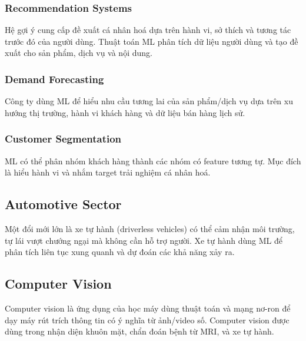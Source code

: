 \subsubsection{Recommendation Systems}
\begin{ynghia}[title={Hệ gợi ý}]
Hệ gợi ý cung cấp đề xuất cá nhân hoá dựa trên hành vi, sở thích và tương tác trước đó của người dùng.
Thuật toán ML phân tích dữ liệu người dùng và tạo đề xuất cho sản phẩm, dịch vụ và nội dung.
\end{ynghia}

\subsubsection{Demand Forecasting}
\begin{ynghia}[title={Dự báo nhu cầu}]
Công ty dùng ML để hiểu nhu cầu tương lai của sản phẩm/dịch vụ dựa trên xu hướng thị trường, hành vi khách hàng và dữ liệu bán hàng lịch sử.
\end{ynghia}

\subsubsection{Customer Segmentation}
\begin{ynghia}[title={Phân khúc khách hàng}]
ML có thể phân nhóm khách hàng thành các nhóm có feature tương tự.
Mục đích là hiểu hành vi và nhắm target trải nghiệm cá nhân hoá.
\end{ynghia}

\subsection{Automotive Sector}

\begin{dongco}[title={Xe tự hành}]
Một đổi mới lớn là xe tự hành (driverless vehicles) có thể cảm nhận môi trường, tự lái vượt chướng ngại mà không cần hỗ trợ người.
Xe tự hành dùng ML để phân tích liên tục xung quanh và dự đoán các khả năng xảy ra.
\end{dongco}

\subsection{Computer Vision}

\begin{dinhnghia}[title={Computer vision trong ML}]
Computer vision là ứng dụng của học máy dùng thuật toán và mạng nơ-ron để dạy máy rút trích thông tin có ý nghĩa từ ảnh/video số.
Computer vision được dùng trong nhận diện khuôn mặt, chẩn đoán bệnh từ MRI, và xe tự hành.
\end{dinhnghia}

